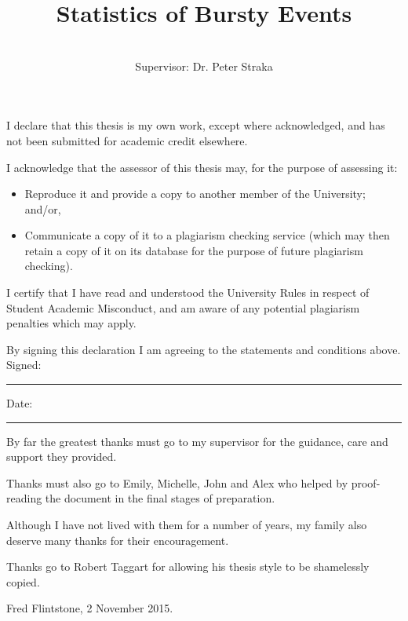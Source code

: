\documentclass[honours,12pt]{unswthesis}
\title{Statistics of Bursty Events}
\author{\Authornameonly\\{\bigskip}Supervisor: Dr. Peter Straka}
\newcommand{\1}{\mathbf 1}
\newcommand\blankpage{%
    \null
    \thispagestyle{empty}%
    \addtocounter{page}{-1}%
    \newpage}
\numberwithin{equation}{section}
\theoremstyle{definition}
\theoremstyle{remark}
\begin{document}
\beforepreface

\afterpage{\blankpage}



\vskip 10pc \noindent I declare that this thesis is my
own work, except where acknowledged, and has not been submitted for
academic credit elsewhere. 

\vskip 2pc  \noindent I acknowledge that the assessor of this
thesis may, for the purpose of assessing it:
\begin{itemize}
\item Reproduce it and provide a copy to another member of the University; and/or,
\item Communicate a copy of it to a plagiarism checking service (which may then retain a copy of it on its database for the purpose of future plagiarism checking).
\end{itemize}

\vskip 2pc \noindent I certify that I have read and understood the University Rules in
respect of Student Academic Misconduct, and am aware of any potential plagiarism penalties which may 
apply.\vspace{24pt}

\vskip 2pc \noindent By signing 
this declaration I am
agreeing to the statements and conditions above.
\vskip 2pc \noindent
Signed: \rule{7cm}{0.25pt} \hfill Date: \rule{4cm}{0.25pt} \newline
\vskip 1pc

\afterpage{\blankpage}




{\bigskip}By far the greatest thanks must go to my supervisor for
the guidance, care and support they provided. 

{\bigskip\noindent}Thanks 
must also go to Emily, Michelle, John and Alex who helped by
proof-reading the document in the final stages of preparation.

{\bigskip\noindent}Although
I have not lived with them for a number of years, my family also deserve
many thanks for their encouragement.

{\bigskip\noindent} Thanks go to Robert Taggart for allowing his thesis
style to be shamelessly copied.

{\bigskip\bigskip\bigskip\noindent} Fred Flintstone, 2 November 2015.

\afterpage{\blankpage}
\end{document}
